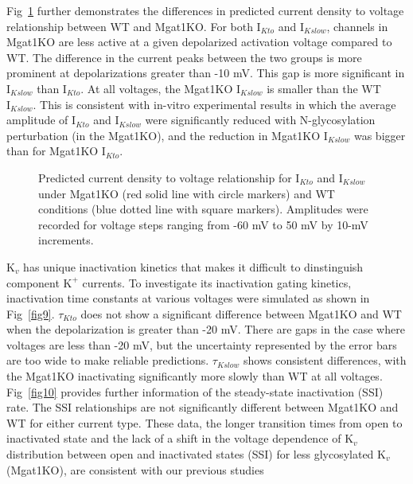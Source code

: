 \documentclass[10pt,letterpaper]{article}
\begin{document}
Fig~\ref{fig8} further demonstrates the differences in predicted current density to voltage relationship between WT and Mgat1KO. For both $\text{I}_{Kto}$ and $\text{I}_{Kslow}$, channels in Mgat1KO are less active at a given depolarized activation voltage compared to WT. The difference in the current peaks between the two groups is more prominent at depolarizations greater than -10 mV. This gap is more significant in $\text{I}_{Kslow}$ than $\text{I}_{Kto}$. At all voltages, the Mgat1KO $\text{I}_{Kslow}$ is smaller than the WT $\text{I}_{Kslow}$. This is consistent with in-vitro experimental results in which the average amplitude of $\text{I}_{Kto}$ and $\text{I}_{Kslow}$ were significantly reduced with N-glycosylation perturbation (in the Mgat1KO), and the reduction in Mgat1KO $\text{I}_{Kslow}$ was bigger than for Mgat1KO $\text{I}_{Kto}$. 

\begin{figure}[!ht]
    \centering
    \caption{Predicted current density to voltage relationship for $\text{I}_{Kto}$ and $\text{I}_{Kslow}$ under Mgat1KO (red solid line with circle markers) and WT conditions (blue dotted line with square markers). Amplitudes were recorded for voltage steps ranging from -60 mV to 50 mV by 10-mV increments.} 
    \label{fig8}
\end{figure}

$\text{K}_{v}$ has unique inactivation kinetics that makes it difficult to dinstinguish component $\text{K}^{+}$ currents. To investigate its inactivation gating kinetics, inactivation time constants at various voltages were simulated as shown in Fig~\ref{fig9}. $\tau_{Kto}$ does not show a significant difference between Mgat1KO and WT when the depolarization is greater than -20 mV. There are gaps in the case where voltages are less than -20 mV, but the uncertainty represented by the error bars are too wide to make reliable predictions. $\tau_{Kslow}$ shows consistent differences, with the Mgat1KO inactivating significantly more slowly than WT at all voltages. Fig~\ref{fig10} provides further information of the steady-state inactivation (SSI) rate. The SSI relationships are not significantly different between Mgat1KO and WT for either current type. These data, the longer transition times from open to inactivated state and the lack of a shift in the voltage dependence of $\text{K}_{v}$ distribution between open and inactivated states (SSI) for less glycosylated $\text{K}_{v}$ (Mgat1KO), are consistent with our previous studies \cite{schwetz2010n, ednie2015reduced, du2017}
\end{document}
